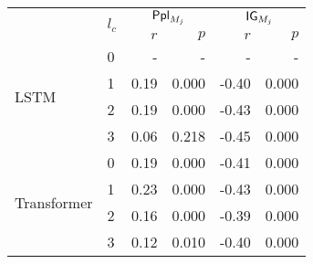 \begin{tabular}{llrrrr}
\toprule
    & \multirow{2}{*}{$l_c$} & \multicolumn{2}{c}{$\mathsf{Ppl}_{M_j}$} & \multicolumn{2}{c}{$\mathsf{IG}_{M_j}$} \\
                              &       &         $r$ &            $p$ &           $r$ &          $p$ \\
\midrule
\multirow{4}{*}{LSTM}         & 0 &            - &              - &             - &             - \\
                              & 1 &         0.19 &          0.000 &         -0.40 &         0.000 \\
                              & 2 &         0.19 &          0.000 &         -0.43 &         0.000 \\
                              & 3 &         0.06 &          0.218 &         -0.45 &         0.000 \\
\midrule
\multirow{4}{*}{Transformer}  & 0 &         0.19 &          0.000 &         -0.41 &         0.000 \\
                              & 1 &         0.23 &          0.000 &         -0.43 &         0.000 \\
                              & 2 &         0.16 &          0.000 &         -0.39 &         0.000 \\
                              & 3 &         0.12 &          0.010 &         -0.40 &         0.000 \\
\bottomrule
\end{tabular}

